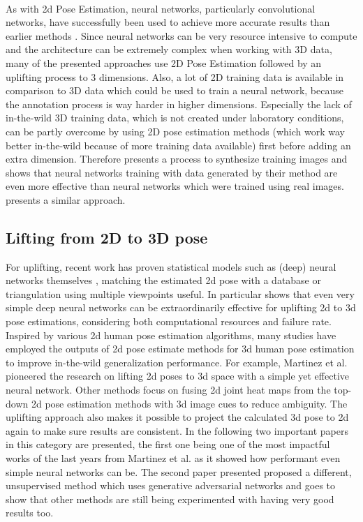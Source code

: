 \\
As with 2d Pose Estimation, neural networks, particularly convolutional networks, have successfully been used to achieve more accurate results than earlier methods \cite{wang_deep_2021, Chen2016, Chen_2017_CVPR, Tome_2017_CVPR, Andrikula2010, Ye2011, Martinez_2017_ICCV}. Since neural networks can be very resource intensive to compute and the architecture can be extremely complex when working with 3D data, many  of the presented approaches use 2D Pose Estimation followed by an uplifting process to 3 dimensions.  Also, a lot of 2D training data is available in comparison to 3D data which could be used to train a neural network, because the annotation process is way harder in higher dimensions. Especially the lack of in-the-wild 3D training data, which is not created under laboratory conditions, can be partly overcome by using 2D pose estimation methods (which work way better in-the-wild because of more training data available) first before adding an extra dimension.
 Therefore \cite{Chen2016} presents a process to synthesize training images and shows that neural networks training with data generated by their method are even more effective than neural networks which were trained using real images. \cite{Rogez2016} presents a similar approach.

\subsection{Lifting from 2D to 3D pose}
For uplifting, recent work has proven statistical models such as (deep) neural networks themselves \cite{Tome_2017_CVPR, Martinez_2017_ICCV}, matching the estimated 2d pose with a database \cite{Chen_2017_CVPR} or triangulation using multiple viewpoints \cite{Dong_2019_CVPR} useful. In particular \cite{Martinez_2017_ICCV} shows that even very simple deep neural networks can be extraordinarily effective for uplifting 2d to 3d pose estimations, considering both computational resources and failure rate.
\newline
Inspired by various 2d human pose estimation algorithms, many studies have employed the outputs of 2d pose estimate methods for 3d human pose estimation to improve in-the-wild generalization performance. For example, Martinez et al. \cite{Martinez_2017_ICCV} pioneered the research on lifting 2d poses to 3d space with a simple yet effective neural network. Other methods \cite{park_3d_2016, zhou_hemlets_2019, habibie_wild_2019, tekin_learning_2017} focus on fusing 2d joint heat maps from the top-down 2d pose estimation methods with 3d image cues to reduce ambiguity. The uplifting approach also makes it possible to project the calculated 3d pose to 2d again to make sure results are consistent. \cite{wang_deep_2021} In the following two important papers in this category are presented, the first one being one of the most impactful works of the last years from Martinez et al. as it showed how performant even simple neural networks can be. The second paper presented proposed a different, unsupervised method which uses generative adversarial networks and goes to show that other methods are still being experimented with having very good results too.


